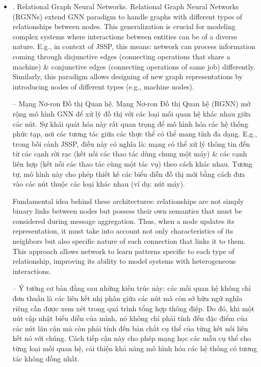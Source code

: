 \documentclass{article}
\begin{document}
\begin{itemize}
\begin{itemize}
\begin{itemize}
\begin{enumerate}
            \end{enumerate}
        \end{itemize}
        \item {. Relational Graph Neural Networks.} Relational Graph Neural Networks (RGNNs) extend GNN paradigm to handle graphs with different types of relationships between nodes. This generalization is crucial for modeling complex systems where interactions between entities can be of a diverse nature. E.g., in context of JSSP, this means: network can process information coming through disjunctive edges (connecting operations that share a machine) \& conjunctive edges (connecting operations of same job) differently. Similarly, this paradigm allows designing of new graph representations by introducing nodes of different types (e.g., machine nodes).

        -- {\sf Mạng Nơ-ron Đồ thị Quan hệ.} Mạng Nơ-ron Đồ thị Quan hệ (RGNN) mở rộng mô hình GNN để xử lý đồ thị với các loại mối quan hệ khác nhau giữa các nút. Sự khái quát hóa này rất quan trọng để mô hình hóa các hệ thống phức tạp, nơi các tương tác giữa các thực thể có thể mang tính đa dạng. E.g., trong bối cảnh JSSP, điều này có nghĩa là: mạng có thể xử lý thông tin đến từ các cạnh rời rạc (kết nối các thao tác dùng chung một máy) \& các cạnh liên hợp (kết nối các thao tác cùng một tác vụ) theo cách khác nhau. Tương tự, mô hình này cho phép thiết kế các biểu diễn đồ thị mới bằng cách đưa vào các nút thuộc các loại khác nhau (ví dụ: nút máy).

        Fundamental idea behind these architectures: relationships are not simply binary links between nodes but possess their own semantics that must be considered during message aggregation. Thus, when a node updates its representation, it must take into account not only characteristics of its neighbors but also specific nature of each connection that links it to them. This approach allows network to learn patterns specific to each type of relationship, improving its ability to model systems with heterogeneous interactions.

        -- Ý tưởng cơ bản đằng sau những kiến trúc này: các mối quan hệ không chỉ đơn thuần là các liên kết nhị phân giữa các nút mà còn sở hữu ngữ nghĩa riêng cần được xem xét trong quá trình tổng hợp thông điệp. Do đó, khi một nút cập nhật biểu diễn của mình, nó không chỉ phải tính đến đặc điểm của các nút lân cận mà còn phải tính đến bản chất cụ thể của từng kết nối liên kết nó với chúng. Cách tiếp cận này cho phép mạng học các mẫu cụ thể cho từng loại mối quan hệ, cải thiện khả năng mô hình hóa các hệ thống có tương tác không đồng nhất.


\end{itemize}
\end{itemize}
\end{document}
